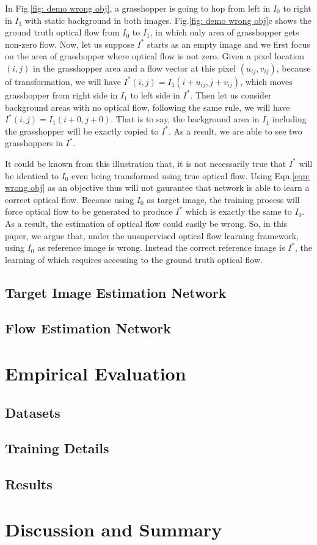 \documentclass[10pt,twocolumn,letterpaper]{article}
\begin{document}
In Fig.\ref{fig: demo wrong obj}, a grasshopper is going to hop from left in $I_0$ to right in $I_1$ with static background in both images. Fig.\ref{fig: demo wrong obj}c shows the ground truth optical flow from $I_0$ to $I_1$, in which only area of grasshopper gets non-zero flow. Now, let us suppose $I^*$ starts as an empty image and we first focus on the area of grasshopper where optical flow is not zero. Given a pixel location $(i, j)$ in the grasshopper area and a flow vector at this pixel $(u_{ij}, v_{ij})$, because of transformation, we will have $I^*(i, j)=I_1(i+u_{ij}, j+v_{ij})$, which moves grasshopper from right side in $I_1$ to left side in $I^*$. Then let us consider background areas with no optical flow, following the same rule, we will have $I^*(i, j)=I_1(i+0, j+0)$. That is to say, the background area in $I_1$ including the grasshopper will be exactly copied to $I^*$. As a result, we are able to see two grasshoppers in $I^*$. 

It could be known from this illustration that, it is not necessarily true that $I^*$ will be identical to $I_0$ even being transformed using true optical flow. Using Eqn.\ref{eqn: wrong obj} as an objective thus will not gaurantee that network is able to learn a correct optical flow. Because using $I_0$ as target image, the training process will force optical flow to be generated to produce $I^*$ which is exactly the same to $I_0$. As a result, the estimation of optical flow could easily be wrong. So, in this paper, we argue that, under the unsupervised optical flow learning framework, using $I_0$ as reference image is wrong. Instead the correct reference image is $I^*$, the learning of which requires accessing to the ground truth optical flow. 

\subsection{Target Image Estimation Network}
\label{subsec: target image net}

\subsection{Flow Estimation Network}
\label{subsec: flow net}

\section{Empirical Evaluation}

\subsection{Datasets}

\subsection{Training Details}

\subsection{Results}

\section{Discussion and Summary}

{\small


}
\end{document}
